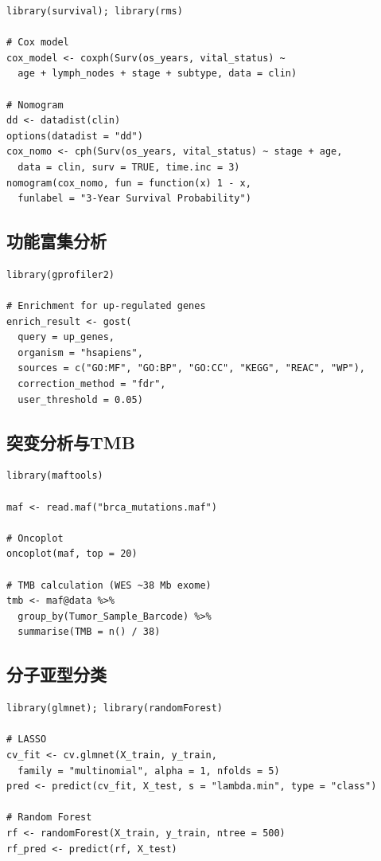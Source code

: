 \documentclass[12pt,a4paper]{ctexart}
\begin{document}
\begin{lstlisting}[caption={Cox回归与预后列线图}, label={lst:survival}]
library(survival); library(rms)

# Cox model
cox_model <- coxph(Surv(os_years, vital_status) ~
  age + lymph_nodes + stage + subtype, data = clin)

# Nomogram
dd <- datadist(clin)
options(datadist = "dd")
cox_nomo <- cph(Surv(os_years, vital_status) ~ stage + age,
  data = clin, surv = TRUE, time.inc = 3)
nomogram(cox_nomo, fun = function(x) 1 - x,
  funlabel = "3-Year Survival Probability")
\end{lstlisting}

\subsection{功能富集分析}

\begin{lstlisting}[caption={g:Profiler功能富集}, label={lst:enrich}]
library(gprofiler2)

# Enrichment for up-regulated genes
enrich_result <- gost(
  query = up_genes,
  organism = "hsapiens",
  sources = c("GO:MF", "GO:BP", "GO:CC", "KEGG", "REAC", "WP"),
  correction_method = "fdr",
  user_threshold = 0.05)
\end{lstlisting}

\subsection{突变分析与TMB}

\begin{lstlisting}[caption={maftools突变分析与TMB计算}, label={lst:mut}]
library(maftools)

maf <- read.maf("brca_mutations.maf")

# Oncoplot
oncoplot(maf, top = 20)

# TMB calculation (WES ~38 Mb exome)
tmb <- maf@data %>%
  group_by(Tumor_Sample_Barcode) %>%
  summarise(TMB = n() / 38)
\end{lstlisting}

\subsection{分子亚型分类}

\begin{lstlisting}[caption={LASSO多分类与随机森林}, label={lst:class}]
library(glmnet); library(randomForest)

# LASSO
cv_fit <- cv.glmnet(X_train, y_train,
  family = "multinomial", alpha = 1, nfolds = 5)
pred <- predict(cv_fit, X_test, s = "lambda.min", type = "class")

# Random Forest
rf <- randomForest(X_train, y_train, ntree = 500)
rf_pred <- predict(rf, X_test)
\end{lstlisting}
\end{document}
